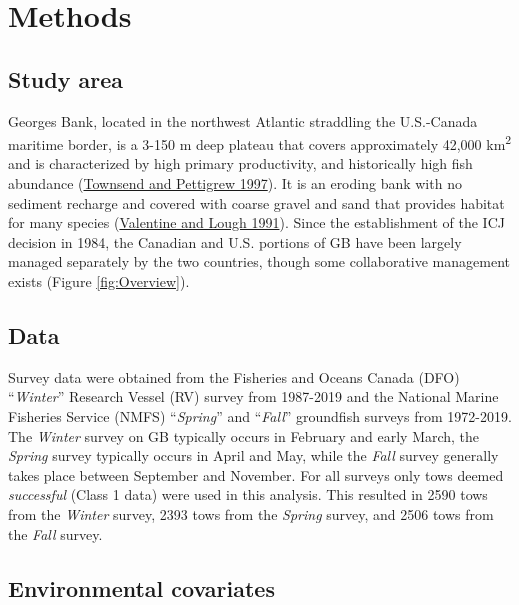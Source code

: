 \documentclass[
]{article}
\begin{document}
\hypertarget{ref-methods}{%
\section{Methods}\label{ref-methods}}

\hypertarget{study-area}{%
\subsection{Study area}\label{study-area}}

Georges Bank, located in the northwest Atlantic straddling the U.S.-Canada maritime border, is a 3-150 m deep plateau that covers approximately 42,000 km\textsuperscript{2} and is characterized by high primary productivity, and historically high fish abundance (\protect\hyperlink{ref-townsendNitrogenLimitationSecondary1997}{Townsend and Pettigrew 1997}). It is an eroding bank with no sediment recharge and covered with coarse gravel and sand that provides habitat for many species (\protect\hyperlink{ref-valentineSeaFloorEnvironment1991}{Valentine and Lough 1991}). Since the establishment of the ICJ decision in 1984, the Canadian and U.S. portions of GB have been largely managed separately by the two countries, though some collaborative management exists (Figure \ref{fig:Overview}).

\hypertarget{data}{%
\subsection{Data}\label{data}}

Survey data were obtained from the Fisheries and Oceans Canada (DFO) ``\emph{Winter}'' Research Vessel (RV) survey from 1987-2019 and the National Marine Fisheries Service (NMFS) ``\emph{Spring}'' and ``\emph{Fall}'' groundfish surveys from 1972-2019. The \emph{Winter} survey on GB typically occurs in February and early March, the \emph{Spring} survey typically occurs in April and May, while the \emph{Fall} survey generally takes place between September and November. For all surveys only tows deemed \emph{successful} (Class 1 data) were used in this analysis. This resulted in 2590 tows from the \emph{Winter} survey, 2393 tows from the \emph{Spring} survey, and 2506 tows from the \emph{Fall} survey.

\hypertarget{environmental-covariates}{%
\subsection{Environmental covariates}\label{environmental-covariates}}
\end{document}
